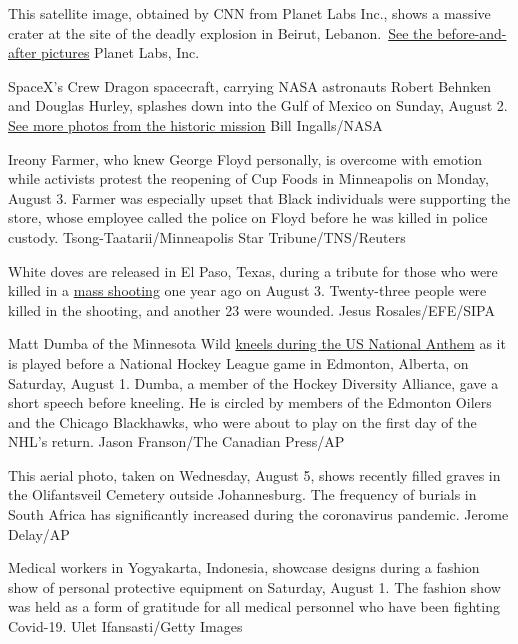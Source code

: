 This satellite image, obtained by CNN from Planet Labs Inc., shows a
massive crater at the site of the deadly explosion in Beirut,
Lebanon.~\href{https://www.cnn.com/2020/08/05/world/satellite-images-beirut-explosion-before-after-trnd/index.html}{See
the before-and-after pictures} Planet Labs, Inc.

SpaceX's Crew Dragon spacecraft, carrying NASA astronauts Robert Behnken
and Douglas Hurley, splashes down into the Gulf of Mexico on Sunday,
August 2.
\href{https://www.cnn.com/2020/05/27/us/gallery/spacex-nasa-launch/index.html}{See
more photos from the historic mission} Bill Ingalls/NASA

Ireony Farmer, who knew George Floyd personally, is overcome with
emotion while activists protest the reopening of Cup Foods in
Minneapolis on Monday, August 3. Farmer was especially upset that Black
individuals were supporting the store, whose employee called the police
on Floyd before he was killed in police custody.
Tsong-Taatarii/Minneapolis Star Tribune/TNS/Reuters

White doves are released in El Paso, Texas, during a tribute for those
who were killed in a
\href{https://www.cnn.com/2020/08/03/us/el-paso-shooting-anniversary/index.html}{mass
shooting} one year ago on August 3. Twenty-three people were killed in
the shooting, and another 23 were wounded. Jesus Rosales/EFE/SIPA

Matt Dumba of the Minnesota Wild
\href{https://www.cnn.com/2020/08/01/us/nhl-matt-dumba-kneeling-national-anthem-spt-trnd/index.html}{kneels
during the US National Anthem} as it is played before a National Hockey
League game in Edmonton, Alberta, on Saturday, August 1. Dumba, a member
of the Hockey Diversity Alliance, gave a short speech before kneeling.
He is circled by members of the Edmonton Oilers and the Chicago
Blackhawks, who were about to play on the first day of the NHL's return.
Jason Franson/The Canadian Press/AP

This aerial photo, taken on Wednesday, August 5, shows recently filled
graves in the Olifantsveil Cemetery outside Johannesburg. The frequency
of burials in South Africa has significantly increased during the
coronavirus pandemic. Jerome Delay/AP

Medical workers in Yogyakarta, Indonesia, showcase designs during a
fashion show of personal protective equipment on Saturday, August 1. The
fashion show was held as a form of gratitude for all medical personnel
who have been fighting Covid-19. Ulet Ifansasti/Getty Images

